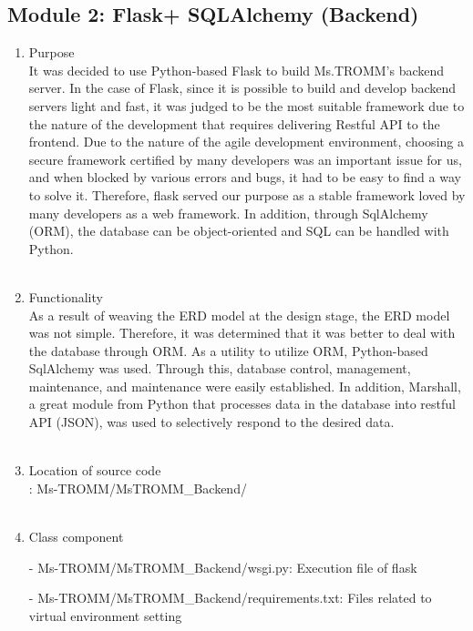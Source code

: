 \documentclass[conference]{IEEEtran}
\begin{document}
\subsection{Module 2: Flask+ SQLAlchemy (Backend)}
\begin{enumerate}
    \item Purpose\\
    It was decided to use Python-based Flask to build Ms.TROMM's backend server. In the case of Flask, since it is possible to build and develop backend servers light and fast, it was judged to be the most suitable framework due to the nature of the development that requires delivering Restful API to the frontend. Due to the nature of the agile development environment, choosing a secure framework certified by many developers was an important issue for us, and when blocked by various errors and bugs, it had to be easy to find a way to solve it. Therefore, flask served our purpose as a stable framework loved by many developers as a web framework. In addition, through SqlAlchemy (ORM), the database can be object-oriented and SQL can be handled with Python.\\ \\
    \item Functionality\\
    As a result of weaving the ERD model at the design stage, the ERD model was not simple. Therefore, it was determined that it was better to deal with the database through ORM. As a utility to utilize ORM, Python-based SqlAlchemy was used. Through this, database control, management, maintenance, and maintenance were easily established. In addition, Marshall, a great module from Python that processes data in the database into restful API (JSON), was used to selectively respond to the desired data.\\ \\
    \item Location of source code\\: Ms-TROMM/MsTROMM\_Backend/ \\ \\
    \item Class component \\
        \item[-] Ms-TROMM/MsTROMM\_Backend/wsgi.py: Execution file of flask \\
        \item[-] Ms-TROMM/MsTROMM\_Backend/requirements.txt: Files related to virtual environment setting \\

\end{enumerate}
\end{document}
